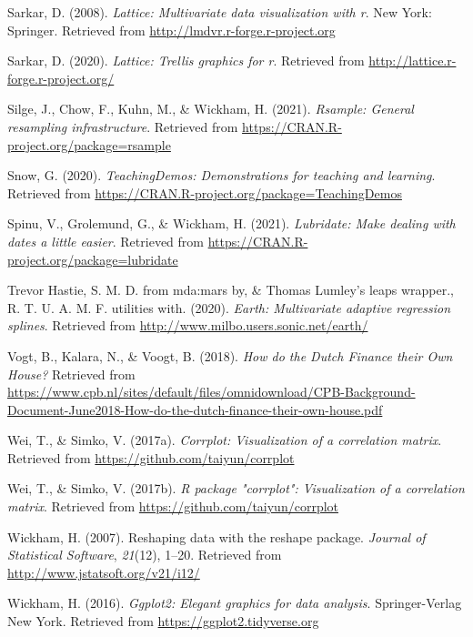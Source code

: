\documentclass[
]{article}
\begin{document}
\leavevmode\hypertarget{ref-lattice2008}{}%
Sarkar, D. (2008). \emph{Lattice: Multivariate data visualization with
r}. New York: Springer. Retrieved from
\url{http://lmdvr.r-forge.r-project.org}

\leavevmode\hypertarget{ref-R-lattice}{}%
Sarkar, D. (2020). \emph{Lattice: Trellis graphics for r}. Retrieved
from \url{http://lattice.r-forge.r-project.org/}

\leavevmode\hypertarget{ref-R-rsample}{}%
Silge, J., Chow, F., Kuhn, M., \& Wickham, H. (2021). \emph{Rsample:
General resampling infrastructure}. Retrieved from
\url{https://CRAN.R-project.org/package=rsample}

\leavevmode\hypertarget{ref-R-TeachingDemos}{}%
Snow, G. (2020). \emph{TeachingDemos: Demonstrations for teaching and
learning}. Retrieved from
\url{https://CRAN.R-project.org/package=TeachingDemos}

\leavevmode\hypertarget{ref-R-lubridate}{}%
Spinu, V., Grolemund, G., \& Wickham, H. (2021). \emph{Lubridate: Make
dealing with dates a little easier}. Retrieved from
\url{https://CRAN.R-project.org/package=lubridate}

\leavevmode\hypertarget{ref-R-earth}{}%
Trevor Hastie, S. M. D. from mda:mars by, \& Thomas Lumley's leaps
wrapper., R. T. U. A. M. F. utilities with. (2020). \emph{Earth:
Multivariate adaptive regression splines}. Retrieved from
\url{http://www.milbo.users.sonic.net/earth/}

\leavevmode\hypertarget{ref-Vogt2018}{}%
Vogt, B., Kalara, N., \& Voogt, B. (2018). \emph{How do the Dutch
Finance their Own House?} Retrieved from
\url{https://www.cpb.nl/sites/default/files/omnidownload/CPB-Background-Document-June2018-How-do-the-dutch-finance-their-own-house.pdf}

\leavevmode\hypertarget{ref-R-corrplot}{}%
Wei, T., \& Simko, V. (2017a). \emph{Corrplot: Visualization of a
correlation matrix}. Retrieved from
\url{https://github.com/taiyun/corrplot}

\leavevmode\hypertarget{ref-corrplot2017}{}%
Wei, T., \& Simko, V. (2017b). \emph{R package "corrplot": Visualization
of a correlation matrix}. Retrieved from
\url{https://github.com/taiyun/corrplot}

\leavevmode\hypertarget{ref-reshape22007}{}%
Wickham, H. (2007). Reshaping data with the reshape package.
\emph{Journal of Statistical Software}, \emph{21}(12), 1--20. Retrieved
from \url{http://www.jstatsoft.org/v21/i12/}

\leavevmode\hypertarget{ref-ggplot22016}{}%
Wickham, H. (2016). \emph{Ggplot2: Elegant graphics for data analysis}.
Springer-Verlag New York. Retrieved from
\url{https://ggplot2.tidyverse.org}
\end{document}
